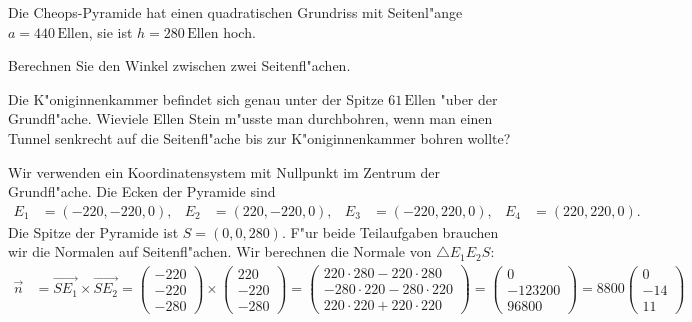 Die Cheops-Pyramide hat einen quadratischen Grundriss mit Seitenl"ange
$a=440\,\text{Ellen}$, sie ist $h=280\,\text{Ellen}$ hoch.
\begin{center}
\end{center}
\begin{teilaufgaben}
\item
Berechnen Sie den Winkel zwischen zwei Seitenfl"achen.
\item
Die K"oniginnenkammer befindet sich genau unter der Spitze $61\,\text{Ellen}$
"uber der Grundfl"ache. Wieviele Ellen Stein m"usste man durchbohren, wenn
man einen Tunnel senkrecht auf die Seitenfl"ache bis zur K"oniginnenkammer
bohren wollte?
\end{teilaufgaben}

\begin{loesung}
Wir verwenden ein Koordinatensystem mit Nullpunkt im Zentrum der
Grundfl"ache. Die Ecken der Pyramide sind
\begin{align*}
E_1&=(-220,-220, 0),&
E_2&=( 220,-220, 0),&
E_3&=(-220, 220, 0),&
E_4&=( 220, 220, 0).
\end{align*}
Die Spitze der Pyramide ist $S=(0,0,280)$.
F"ur beide Teilaufgaben brauchen wir die Normalen auf Seitenfl"achen.
Wir berechnen die Normale von $\triangle E_1E_2S$:
\begin{align*}
\vec n
&=
\overrightarrow{SE_1}\times \overrightarrow{SE_2}
=
\begin{pmatrix}-220\\-220\\-280\end{pmatrix}
\times
\begin{pmatrix} 220\\-220\\-280\end{pmatrix}
=
\begin{pmatrix}
220\cdot 280-220\cdot280\\
-280\cdot220-280\cdot220\\
220\cdot220+220\cdot 220
\end{pmatrix}
=
\begin{pmatrix} 0\\ -123200\\ 96800 \end{pmatrix}
=
8800
\begin{pmatrix} 0\\ -14\\ 11 \end{pmatrix}
\end{align*}

\end{loesung}

